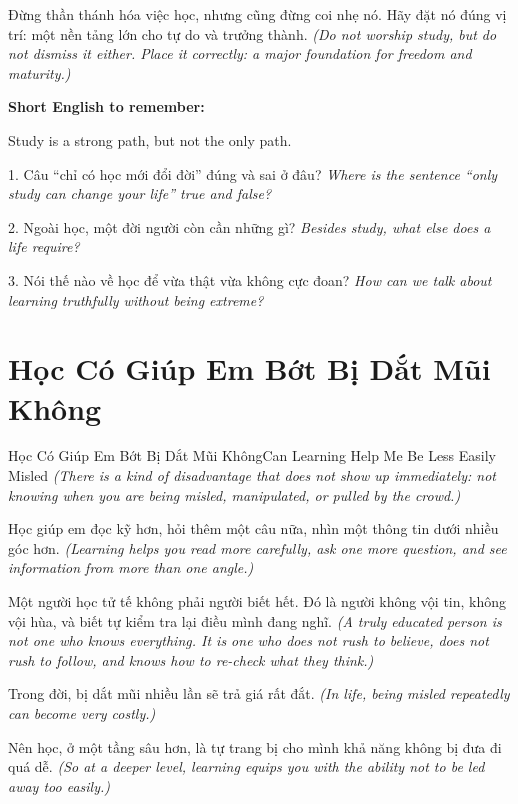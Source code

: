 \begin{baihoc}
Đừng thần thánh hóa việc học, nhưng cũng đừng coi nhẹ nó. Hãy đặt nó đúng vị trí: một nền tảng lớn cho tự do và trưởng thành.
\textit{(Do not worship study, but do not dismiss it either. Place it correctly: a major foundation for freedom and maturity.)}
\end{baihoc}

\begin{ghinhoanh}
\textbf{Short English to remember:}

Study is a strong path, but not the only path.

\end{ghinhoanh}

\begin{tuhocnhanh}
1. Câu “chỉ có học mới đổi đời” đúng và sai ở đâu? \textit{Where is the sentence “only study can change your life” true and false?}

2. Ngoài học, một đời người còn cần những gì? \textit{Besides study, what else does a life require?}

3. Nói thế nào về học để vừa thật vừa không cực đoan? \textit{How can we talk about learning truthfully without being extreme?}
\end{tuhocnhanh}
\ngancach

\section{Học Có Giúp Em Bớt Bị Dắt Mũi Không}
\begin{truyen}{Học Có Giúp Em Bớt Bị Dắt Mũi Không}{Can Learning Help Me Be Less Easily Misled}
\textit{(There is a kind of disadvantage that does not show up immediately: not knowing when you are being misled, manipulated, or pulled by the crowd.)}

Học giúp em đọc kỹ hơn, hỏi thêm một câu nữa, nhìn một thông tin dưới nhiều góc hơn.
\textit{(Learning helps you read more carefully, ask one more question, and see information from more than one angle.)}

Một người học tử tế không phải người biết hết. Đó là người không vội tin, không vội hùa, và biết tự kiểm tra lại điều mình đang nghĩ.
\textit{(A truly educated person is not one who knows everything. It is one who does not rush to believe, does not rush to follow, and knows how to re-check what they think.)}

Trong đời, bị dắt mũi nhiều lần sẽ trả giá rất đắt.
\textit{(In life, being misled repeatedly can become very costly.)}

Nên học, ở một tầng sâu hơn, là tự trang bị cho mình khả năng không bị đưa đi quá dễ.
\textit{(So at a deeper level, learning equips you with the ability not to be led away too easily.)}
\end{truyen}

